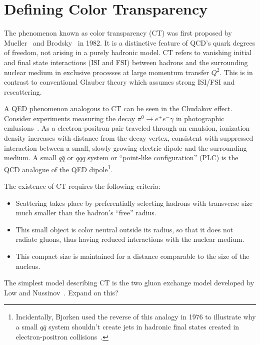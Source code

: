 \section{Defining Color Transparency}
The phenomenon known as color transparency (CT) was first proposed by
Mueller~\cite{Mueller_1982} and Brodsky~\cite{Brodsky_1982} in 1982.
It is a distinctive feature of QCD's quark degrees of freedom, not arising in a
purely hadronic model.
CT refers to vanishing initial and final state interactions (ISI and FSI)
between hadrons and the surrounding nuclear medium in exclusive processes
at large momentum transfer $Q^2$.
This is in contrast to conventional Glauber theory which assumes strong ISI/FSI
and rescattering.


A QED phenomenon analogous to CT can be seen in the Chudakov effect.
Consider experiments measuring the decay $\pi^0 \rightarrow e^+ e^- \gamma$
in photographic emlusions~\cite{Perkins_1955, Fowler_1955, Wolter_1956,
Iwadare_1958, Varfolomeev_1959, Zielinski_1985}.
As a electron-positron pair traveled through an emulsion,
ionization density increases with distance from the decay vertex,
consistent with suppressed interaction between a
small, slowly growing electric dipole and the surrounding medium.
A small $q\bar{q}$ or $qqq$ system or ``point-like configuration'' (PLC) is the
QCD analogue of the QED dipole\footnote{Incidentally, Bjorken used
the reverse of this analogy in 1976 to illustrate why a small
$q\bar{q}$ system shouldn't create jets in hadronic final
states created in electron-positron collisions~\cite{Bjorken_1976}.}.


The existence of CT requires the following criteria:
\begin{itemize}
    \item Scattering takes place by preferentially selecting hadrons with
          transverse size much smaller than the hadron's ``free'' radius.
    \item This small object is color neutral outside its radius, so that it
          does not radiate gluons, thus having reduced interactions with the
          nuclear medium.
    \item This compact size is maintained for a distance comparable to the size
          of the nucleus.
\end{itemize}


The simplest model describing CT is the two gluon exchange model developed by
Low and Nussinov~\cite{Low_1975, Nussinov_1975, Nussinov_1976}.
Expand on this?



